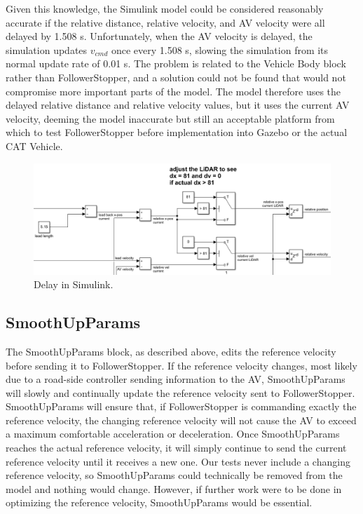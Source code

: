 \documentclass[conference]{IEEEtran}
\begin{document}
Given this knowledge, the Simulink model could be considered reasonably accurate if the relative distance, relative velocity, and AV velocity were all delayed by 1.508 s. Unfortunately, when the AV velocity is delayed, the simulation updates $v_{cmd}$ once every 1.508 s, slowing the simulation from its normal update rate of 0.01 s. The problem is related to the Vehicle Body block rather than FollowerStopper, and a solution could not be found that would not compromise more important parts of the model. The model therefore uses the delayed relative distance and relative velocity values, but it uses the current AV velocity, deeming the model inaccurate but still an acceptable platform from which to test FollowerStopper before implementation into Gazebo or the actual CAT Vehicle.

\begin{figure}[htbp]
\centerline{\includegraphics[width=3.5 in]{delay.PNG}}
\caption{Delay in Simulink.}
\label{fig2}
\end{figure}

\subsection{SmoothUpParams}
The SmoothUpParams block, as described above, edits the reference velocity before sending it to FollowerStopper. If the reference velocity changes, most likely due to a road-side controller sending information to the AV, SmoothUpParams will slowly and continually update the reference velocity sent to FollowerStopper. SmoothUpParams will ensure that, if FollowerStopper is commanding exactly the reference velocity, the changing reference velocity will not cause the AV to exceed a maximum comfortable acceleration or deceleration. Once SmoothUpParams reaches the actual reference velocity, it will simply continue to send the current reference velocity until it receives a new one. Our tests never include a changing reference velocity, so SmoothUpParams could technically be removed from the model and nothing would change. However, if further work were to be done in optimizing the reference velocity, SmoothUpParams would be essential.
\end{document}
